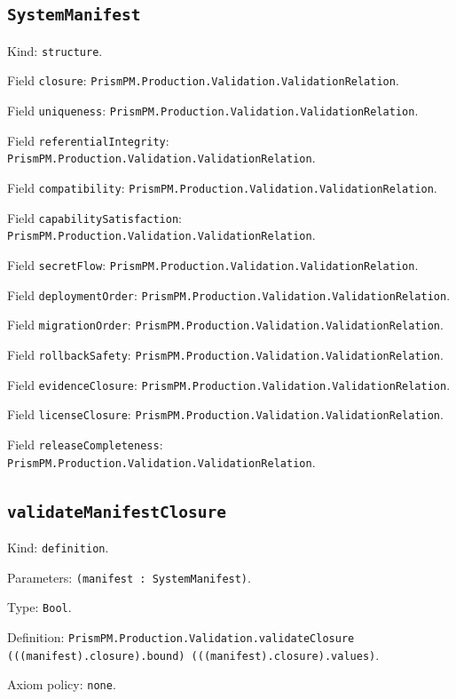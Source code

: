 \documentclass[11pt]{article}
\begin{document}
\subsection*{\texttt{SystemManifest}}
\noindent Kind: \texttt{structure}.\par
\noindent Field \texttt{closure}: \texttt{PrismPM.Production.Validation.ValidationRelation}.\par
\noindent Field \texttt{uniqueness}: \texttt{PrismPM.Production.Validation.ValidationRelation}.\par
\noindent Field \texttt{referentialIntegrity}: \texttt{PrismPM.Production.Validation.ValidationRelation}.\par
\noindent Field \texttt{compatibility}: \texttt{PrismPM.Production.Validation.ValidationRelation}.\par
\noindent Field \texttt{capabilitySatisfaction}: \texttt{PrismPM.Production.Validation.ValidationRelation}.\par
\noindent Field \texttt{secretFlow}: \texttt{PrismPM.Production.Validation.ValidationRelation}.\par
\noindent Field \texttt{deploymentOrder}: \texttt{PrismPM.Production.Validation.ValidationRelation}.\par
\noindent Field \texttt{migrationOrder}: \texttt{PrismPM.Production.Validation.ValidationRelation}.\par
\noindent Field \texttt{rollbackSafety}: \texttt{PrismPM.Production.Validation.ValidationRelation}.\par
\noindent Field \texttt{evidenceClosure}: \texttt{PrismPM.Production.Validation.ValidationRelation}.\par
\noindent Field \texttt{licenseClosure}: \texttt{PrismPM.Production.Validation.ValidationRelation}.\par
\noindent Field \texttt{releaseCompleteness}: \texttt{PrismPM.Production.Validation.ValidationRelation}.\par
\subsection*{\texttt{validateManifestClosure}}
\noindent Kind: \texttt{definition}.\par
\noindent Parameters: \texttt{(manifest : SystemManifest)}.\par
\noindent Type: \texttt{Bool}.\par
\noindent Definition: \texttt{PrismPM.Production.Validation.validateClosure (((manifest).closure).bound) (((manifest).closure).values)}.\par
\noindent Axiom policy: \texttt{none}.\par
\end{document}
